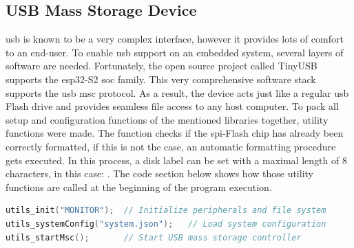 \subsection{USB Mass Storage Device}
\acrshort{usb} is known to be a very complex interface, however it provides lots of comfort to an end-user. To enable \acrshort{usb} support on an embedded system, several layers of software are needed. Fortunately, the open source project called TinyUSB supports the \gls{esp32}-S2 \acrshort{soc} family. This very comprehensive software stack supports the \acrshort{usb} \acrfull{msc} protocol.
As a result, the device acts just like a regular \acrshort{usb} Flash drive and provides seamless file access to any host computer. \newline
To pack all setup and configuration functions of the mentioned libraries together, utility functions were made. The  function checks if the \acrshort{spi}-Flash chip has already been correctly formatted, if this is not the case, an automatic formatting procedure gets executed. In this process, a disk label can be set with a maximal length of 8 characters, in this case: . The code section below shows how those utility functions are called at the beginning of the program execution.

\bigskip
{}
\begin{lstlisting}[backgroundcolor=\color{gray!10},  
                   basicstyle=\ttfamily,
                   columns=fullflexible,
                   breakatwhitespace=false,      
                   breaklines=true,                
                   captionpos=b,                    
                   commentstyle=\color{mygreen}, 
                   extendedchars=true,              
                   frame=single,                   
                   keepspaces=true,             
                   keywordstyle=\color{blue},      
                   language=c++,                 
                   numbers=none,                
                   numbersep=5pt,                   
                   numberstyle=\tiny\color{blue}, 
                   rulecolor=\color{mygray},        
                   showspaces=false,
                   showstringspaces=false,
                   showtabs=false,                 
                   stepnumber=5,                  
                   stringstyle=\color{mymauve},    
                   tabsize=2,                      
                   title=\lstname,
                   frame=none,
                   xleftmargin = 1cm,
                   framexleftmargin = 1em]
utils_init("MONITOR");  // Initialize peripherals and file system
utils_systemConfig("system.json");   // Load system configuration
utils_startMsc();       // Start USB mass storage controller
\end{lstlisting}

